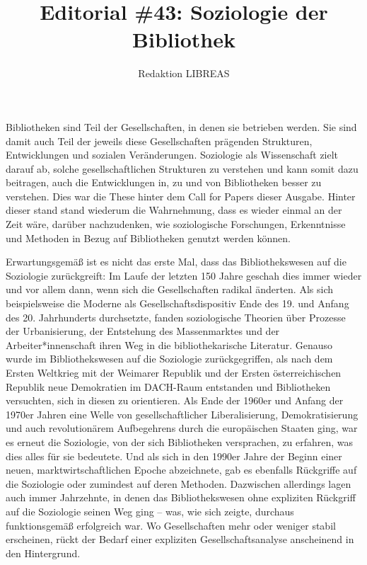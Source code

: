 \documentclass[a4paper,
fontsize=11pt,
oneside,
numbers=noperiodatend,
parskip=half-,
bibliography=totoc,
final
]{scrartcl}
\title{\LARGE{Editorial \#43: Soziologie der Bibliothek}}%
\author{Redaktion LIBREAS} %
\date{}
\begin{document}
\maketitle
\thispagestyle{fancyplain} 


Bibliotheken sind Teil der Gesellschaften, in denen sie betrieben
werden. Sie sind damit auch Teil der jeweils diese Gesellschaften
prägenden Strukturen, Entwicklungen und sozialen Veränderungen.
Soziologie als Wissenschaft zielt darauf ab, solche gesellschaftlichen
Strukturen zu verstehen und kann somit dazu beitragen, auch die
Entwicklungen in, zu und von Bibliotheken besser zu verstehen. Dies war
die These hinter dem Call for Papers dieser Ausgabe. Hinter dieser stand
stand wiederum die Wahrnehmung, dass es wieder einmal an der Zeit wäre,
darüber nachzudenken, wie soziologische Forschungen, Erkenntnisse und
Methoden in Bezug auf Bibliotheken genutzt werden können.

Erwartungsgemäß ist es nicht das erste Mal, dass das Bibliothekswesen
auf die Soziologie zurückgreift: Im Laufe der letzten 150 Jahre geschah
dies immer wieder und vor allem dann, wenn sich die Gesellschaften
radikal änderten. Als sich beispielsweise die Moderne als
Gesellschaftsdispositiv Ende des 19. und Anfang des 20. Jahrhunderts
durchsetzte, fanden soziologische Theorien über Prozesse der
Urbanisierung, der Entstehung des Massenmarktes und der
Arbeiter*innenschaft ihren Weg in die bibliothekarische Literatur.
Genauso wurde im Bibliothekswesen auf die Soziologie zurückgegriffen,
als nach dem Ersten Weltkrieg mit der Weimarer Republik und der Ersten
österreichischen Republik neue Demokratien im DACH-Raum entstanden und
Bibliotheken versuchten, sich in diesen zu orientieren. Als Ende der
1960er und Anfang der 1970er Jahren eine Welle von gesellschaftlicher
Liberalisierung, Demokratisierung und auch revolutionärem Aufbegehrens
durch die europäischen Staaten ging, war es erneut die Soziologie, von
der sich Bibliotheken versprachen, zu erfahren, was dies alles für sie
bedeutete. Und als sich in den 1990er Jahre der Beginn einer neuen,
marktwirtschaftlichen Epoche abzeichnete, gab es ebenfalls Rückgriffe
auf die Soziologie oder zumindest auf deren Methoden. Dazwischen
allerdings lagen auch immer Jahrzehnte, in denen das Bibliothekswesen
ohne expliziten Rückgriff auf die Soziologie seinen Weg ging -- was, wie
sich zeigte, durchaus funktionsgemäß erfolgreich war. Wo Gesellschaften
mehr oder weniger stabil erscheinen, rückt der Bedarf einer expliziten
Gesellschaftsanalyse anscheinend in den Hintergrund.
\end{document}
